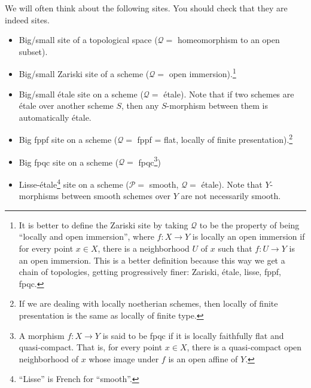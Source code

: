 We will often think about the following sites. You should check that they are indeed
sites.
\begin{itemize}
 \item Big/small site of a topological space ($\mathcal Q=$ homeomorphism to an open subset).
 \item Big/small Zariski site of a scheme ($\mathcal Q=$ open immersion).\footnote{It is better to define the Zariski site by taking $\mathcal Q$ to be the property of being ``locally and open immersion'', where $f:X\to Y$ is locally an open immersion if for every point $x\in X$, there is a neighborhood $U$ of $x$ such that $f:U\to Y$ is an open immersion. This is a better definition because this way we get a chain of topologies, getting progressively finer: Zariski, \'etale, lisse, fppf, fpqc.}
 \item Big/small \'etale site on a scheme ($\mathcal Q=$ \'etale). Note that if two schemes are \'etale over another scheme $S$, then any $S$-morphism between them is automatically \'etale.
 \item Big fppf site on a scheme ($\mathcal Q=$ fppf = flat, locally of finite presentation).\footnote{If we are dealing with locally noetherian schemes, then locally of finite presentation is the same as locally of finite type.}
 \item Big fpqc site on a scheme ($\mathcal Q=$ fpqc\footnote{A morphism $f\colon X\to Y$ is said to be fpqc if it is locally faithfully flat and quasi-compact. That is, for every point $x\in X$, there is a quasi-compact open neighborhood of $x$ whose image under $f$ is an open affine of $Y$.})
 \item Lisse-\'etale\footnote{``Lisse'' is French for ``smooth''.} site on a scheme ($\mathcal P=$ smooth, $\mathcal Q=$ \'etale). Note that $Y$-morphisms between smooth schemes over $Y$ are not necessarily smooth.
\end{itemize}

